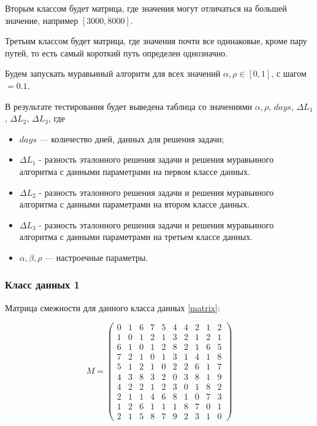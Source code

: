 Вторым классом будет матрица, где значения могут отличаться на большей значение, например $[3000, 8000]$.

Третьим классом будет матрица, где значения почти все одинаковые, кроме пару путей, то есть самый короткий путь определен однозначно.

Будем запускать муравьиный алгоритм для всех значений $\alpha, \rho\in[0, 1]$, с шагом $= 0.1$.

В результате тестирования будет выведена таблица со значениями $\alpha, \rho$, $days$, $\Delta L_{1}$, $\Delta L_{2}$, $\Delta L_{3}$, где
\begin{itemize}
	\item $days$ — количество дней, данных для решения задачи;
	\item $\Delta L_{1}$ - разность эталонного решения задачи и решения муравьиного алгоритма с данными параметрами на первом классе данных.
	\item $\Delta L_{2}$ - разность эталонного решения задачи и решения муравьиного алгоритма с данными параметрами на втором классе данных.
	\item $\Delta L_{3}$ - разность эталонного решения задачи и решения муравьиного алгоритма с данными параметрами на третьем классе данных.
	\item $\alpha, \beta, \rho$ — настроечные параметры.
\end{itemize}

\subsubsection{Класс данных 1}
Матрица смежности для данного класса данных \eqref{matrix}:

\begin{equation}
\label{matrix}
M = \begin{pmatrix}
0 & 1 & 6 & 7 & 5 & 4 & 4 & 2 & 1 & 2\\
1 & 0 & 1 & 2 & 1 & 3 & 2 & 1 & 2 & 1\\
6 & 1 & 0 & 1 & 2 & 8 & 2 & 1 & 6 & 5\\
7 & 2 & 1 & 0 & 1 & 3 & 1 & 4 & 1 & 8\\
5 & 1 & 2 & 1 & 0 & 2 & 2 & 6 & 1 & 7\\
4 & 3 & 8 & 3 & 2 & 0 & 3 & 8 & 1 & 9\\
4 & 2 & 2 & 1 & 2 & 3 & 0 & 1 & 8 & 2\\
2 & 1 & 1 & 4 & 6 & 8 & 1 & 0 & 7 & 3\\
1 & 2 & 6 & 1 & 1 & 1 & 8 & 7 & 0 & 1\\
2 & 1 & 5 & 8 & 7 & 9 & 2 & 3 & 1 & 0
\end{pmatrix}
\end{equation}


